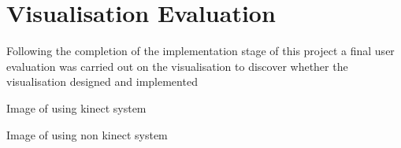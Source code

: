 \chapter{Visualisation Evaluation}\label{C:sd}
Following the completion of the implementation stage of this project a final user evaluation was carried out on the visualisation to discover whether the visualisation designed and implemented 

Image of using kinect system

Image of using non kinect system
